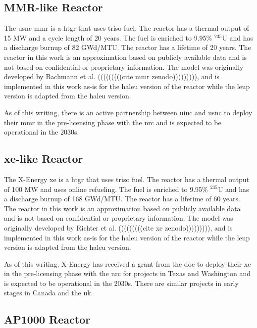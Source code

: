 \subsection{MMR-like Reactor}
\label{sec:mmr}

The \gls{usnc} \gls{mmr} is a \gls{htgr} that uses \gls{triso} fuel. The reactor has a thermal output of 15 MW and a cycle length of 20 years. The fuel is enriched to 9.95\% $^{235}$U and has a discharge burnup of 82 GWd/MTU. The reactor has a lifetime of 20 years. The reactor in this work is an approximation based on publicly available data and is not based on confidential or proprietary information. The model was originally developed by Bachmann et al. (((((((((cite mmr zenodo))))))))), and is implemented in this work as-is for the \gls{haleu} version of the reactor while the \gls{leup} version is adapted from the \gls{haleu} version.

As of this writing, there is an active partnership between \gls{uiuc} and \gls{usnc} to deploy their \gls{mmr} in the pre-licensing phase with the \gls{nrc} and is expected to be operational in the 2030s.


\subsection{\gls{xe}-like Reactor}
\label{sec:xe}

The X-Energy \gls{xe} is a \gls{htgr} that uses \gls{triso} fuel. The reactor has a thermal output of 100 MW and uses online refueling. The fuel is enriched to 9.95\% $^{235}$U and has a discharge burnup of 168 GWd/MTU. The reactor has a lifetime of 60 years. The reactor in this work is an approximation based on publicly available data and is not based on confidential or proprietary information. The model was originally developed by Richter et al. (((((((((cite xe zenodo))))))))), and is implemented in this work as-is for the \gls{haleu} version of the reactor while the \gls{leup} version is adapted from the \gls{haleu} version.

As of this writing, X-Energy has received a grant from the \gls{doe} to deploy their \gls{xe} in the pre-licensing phase with the \gls{nrc} for projects in Texas and Washington and is expected to be operational in the 2030s. There are similar projects in early stages in Canada and the \gls{uk}.


\subsection{AP1000 Reactor}
\label{sec:ap}

